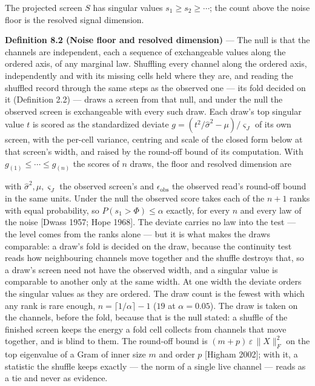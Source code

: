 \documentclass[10pt,letterpaper,twocolumn]{article}
\begin{document}
The projected screen \(S\) has singular values \(s_1\ge s_2\ge\cdots\); the count above the noise floor is the resolved signal dimension.

\textbf{Definition 8.2 (Noise floor and resolved dimension)} --- The null is that the channels are independent, each a sequence of exchangeable values along the ordered axis, of any marginal law. Shuffling every channel along the ordered axis, independently and with its missing cells held where they are, and reading the shuffled record through the same steps as the observed one --- its fold decided on it (Definition 2.2) --- draws a screen from that null, and under the null the observed screen is exchangeable with every such draw. Each draw's top singular value \(t\) is scored as the standardized deviate \(g=(t^2/\hat\sigma^2-\mu)/\varsigma_J\) of its own screen, with the per-cell variance, centring and scale of the closed form below at that screen's width, and raised by the round-off bound of its computation. With \(g_{(1)}\le\cdots\le g_{(n)}\) the scores of \(n\) draws, the floor and resolved dimension are


with \(\hat\sigma^2,\mu,\varsigma_J\) the observed screen's and \(\epsilon_{\mathrm{obs}}\) the observed read's round-off bound in the same units. Under the null the observed score takes each of the \(n+1\) ranks with equal probability, so \(P(s_1>\Phi)\le\alpha\) exactly, for every \(n\) and every law of the noise {[}Dwass 1957; Hope 1968{]}. The deviate carries no law into the test --- the level comes from the ranks alone --- but it is what makes the draws comparable: a draw's fold is decided on the draw, because the continuity test reads how neighbouring channels move together and the shuffle destroys that, so a draw's screen need not have the observed width, and a singular value is comparable to another only at the same width. At one width the deviate orders the singular values as they are ordered. The draw count is the fewest with which any rank is rare enough, \(n=\lceil1/\alpha\rceil-1\) (\(19\) at \(\alpha=0.05\)). The draw is taken on the channels, before the fold, because that is the null stated: a shuffle of the finished screen keeps the energy a fold cell collects from channels that move together, and is blind to them. The round-off bound is \((m+p)\,\varepsilon\,\|X\|_F^2\) on the top eigenvalue of a Gram of inner size \(m\) and order \(p\) {[}Higham 2002{]}; with it, a statistic the shuffle keeps exactly --- the norm of a single live channel --- reads as a tie and never as evidence.
\end{document}
